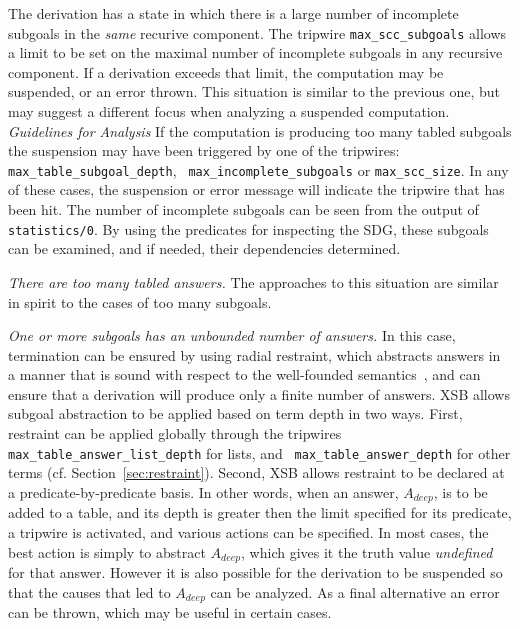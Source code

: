 \item The derivation has a state in which there is a large number of
  incomplete subgoals in the {\em same} recurive component.  The
  tripwire {\tt max\_scc\_subgoals} allows a limit to be set on the
  maximal number of incomplete subgoals in any recursive component.
  If a derivation exceeds that limit, the computation may be
  suspended, or an error thrown.  This situation is similar to the
  previous one, but may suggest a different focus when analyzing a
  suspended computation.  
%
\ei 
%
{\em Guidelines for Analysis} If the computation is producing too many
tabled subgoals the suspension may have been triggered by one of the
tripwires: {\tt max\_table\_subgoal\_depth}, {\tt
  max\_incomplete\_subgoals} or {\tt max\_scc\_size}.  In any of these
cases, the suspension or error message will indicate the tripwire that
has been hit.  The number of incomplete subgoals can be seen from the
output of {\tt statistics/0}.  By using the predicates for inspecting
the SDG, these subgoals can be examined, and if needed, their
dependencies determined.
%
\ei
\ei 

\bi

\item {\em There are too many tabled answers.} The approaches to this
  situation are similar in spirit to the cases of too many subgoals.
%
\bi
\item {\em One or more subgoals has an unbounded number of answers.}
  In this case, termination can be ensured by using radial restraint,
  which abstracts answers in a manner that is sound with respect to
  the well-founded semantics~\cite{GroS13}, and can ensure that a
  derivation will produce only a finite number of answers.  XSB allows
  subgoal abstraction to be applied based on term depth in two ways.
  First, restraint can be applied globally through the tripwires {\tt
    max\_table\_answer\_list\_depth} for lists, and {\tt
    max\_table\_answer\_depth} for other terms
  (cf. Section~\ref{sec:restraint}).  Second, XSB allows restraint to
  be declared at a predicate-by-predicate basis.  In other words, when
  an answer, $A_{deep}$, is to be added to a table, and its depth is
  greater then the limit specified for its predicate, a tripwire is
  activated, and various actions can be specified.  In most cases, the
  best action is simply to abstract $A_{deep}$, which gives it the
  truth value {\em undefined} for that answer. However it is also
  possible for the derivation to be suspended so that the causes that
  led to $A_{deep}$ can be analyzed.  As a final alternative an error
  can be thrown, which may be useful in certain cases.

